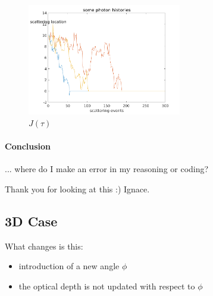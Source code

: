 \documentclass[../main/main.tex]{subfiles}
\begin{document}
\begin{figure}[!htp]
\centering
\includegraphics[width=0.6\textwidth]{../../introductory_exercises/limb_darkening/figures/photon_path_tau_nphot100000.png}
\caption{$J(\tau)$}
\label{J(tau)}
\end{figure}

\paragraph{Conclusion} ... where do I make an error in my reasoning or coding?

Thank you for looking at this :) Ignace.

\newpage
\subsection{3D Case}
\label{3D_limb_darkening}

What changes is this: 
\begin{itemize}
\item introduction of a new angle $\phi$
\item the optical depth is not updated with respect to $\phi$ 
\end{itemize}
\end{document}
